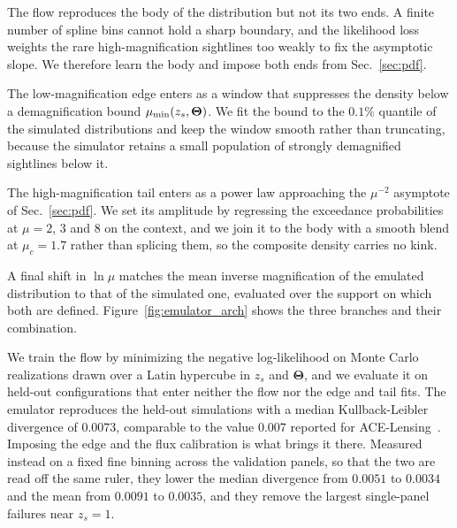 \documentclass[aps,prd,10pt,nofootinbib,twocolumn,superscriptaddress,floatfix,notitlepage]{revtex4-1}
\newcommand{\vect}[1]{\boldsymbol{#1}}
\begin{document}
The flow reproduces the body of the distribution but not its two ends. A finite number of spline bins cannot hold a sharp boundary, and the likelihood loss weights the rare high-magnification sightlines too weakly to fix the asymptotic slope. We therefore learn the body and impose both ends from Sec.~\ref{sec:pdf}.

The low-magnification edge enters as a window that suppresses the density below a demagnification bound $\mu_{\rm min}(z_s,\vect\Theta)$. We fit the bound to the $0.1\%$ quantile of the simulated distributions and keep the window smooth rather than truncating, because the simulator retains a small population of strongly demagnified sightlines below it.

The high-magnification tail enters as a power law approaching the $\mu^{-2}$ asymptote of Sec.~\ref{sec:pdf}. We set its amplitude by regressing the exceedance probabilities at $\mu = 2$, $3$ and $8$ on the context, and we join it to the body with a smooth blend at $\mu_c = 1.7$ rather than splicing them, so the composite density carries no kink.

A final shift in $\ln\mu$ matches the mean inverse magnification of the emulated distribution to that of the simulated one, evaluated over the support on which both are defined. Figure~\ref{fig:emulator_arch} shows the three branches and their combination.

We train the flow by minimizing the negative log-likelihood on Monte Carlo realizations drawn over a Latin hypercube in $z_s$ and $\vect\Theta$, and we evaluate it on held-out configurations that enter neither the flow nor the edge and tail fits. The emulator reproduces the held-out simulations with a median Kullback-Leibler divergence of $0.0073$, comparable to the value $0.007$ reported for ACE-Lensing~\cite{Turker:2025rdt}. Imposing the edge and the flux calibration is what brings it there. Measured instead on a fixed fine binning across the validation panels, so that the two are read off the same ruler, they lower the median divergence from $0.0051$ to $0.0034$ and the mean from $0.0091$ to $0.0035$, and they remove the largest single-panel failures near $z_s = 1$.
\end{document}
